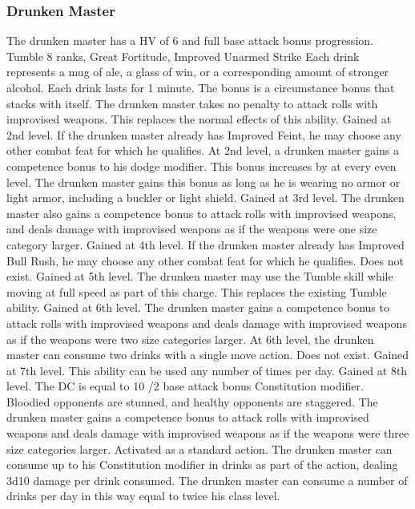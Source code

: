 \subsubsection{Drunken Master}
 The drunken master has a HV of 6 and full base attack bonus progression.
 Tumble 8 ranks, Great Fortitude, Improved Unarmed Strike
 Each drink represents a mug of ale, a glass of win, or a corresponding amount of stronger alcohol. Each drink lasts for 1 minute. The bonus is a circumstance bonus that stacks with itself.
 The drunken master takes no penalty to attack rolls with improvised weapons. This replaces the normal effects of this ability.
 Gained at 2nd level. If the drunken master already has Improved Feint, he may choose any other combat feat for which he qualifies.
 At 2nd level, a drunken master gains a  competence bonus to his dodge modifier. This bonus increases by  at every even level. The drunken master gains this bonus as long as he is wearing no armor or light armor, including a buckler or light shield.
 Gained at 3rd level. The drunken master also gains a  competence bonus to attack rolls with improvised weapons, and deals damage with improvised weapons as if the weapons were one size category larger.
 Gained at 4th level. If the drunken master already has Improved Bull Rush, he may choose any other combat feat for which he qualifies.
 Does not exist.
 Gained at 5th level. The drunken master may use the Tumble skill while moving at full speed as part of this charge. This replaces the existing Tumble ability.
 Gained at 6th level. The drunken master gains a  competence bonus to attack rolls with improvised weapons and deals damage with improvised weapons as if the weapons were two size categories larger.
 At 6th level, the drunken master can consume two drinks with a single move action.
 Does not exist.
 Gained at 7th level. This ability can be used any number of times per day.
 Gained at 8th level. The DC is equal to 10 /2 base attack bonus \add Constitution modifier. Bloodied opponents are stunned, and healthy opponents are staggered.
 The drunken master gains a  competence bonus to attack rolls with improvised weapons and deals damage with improvised weapons as if the weapons were three size categories larger.
 Activated as a standard action. The drunken master can consume up to his Constitution modifier in drinks as part of the action, dealing 3d10 damage per drink consumed. The drunken master can consume a number of drinks per day in this way equal to twice his class level.
